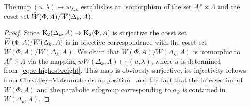 \begin{lemma} \label{lem:can-repr2}
The map $(u, \lambda) \mapsto w_{\lambda, u}$ establishes an isomorphism of the set $A^\times \times \Lambda$ and the coset set $\widehat{W}(\Phi, A) / \overline{W}(\Delta_k, A)$.
\end{lemma}
\begin{proof}
    Since $\operatorname{K}_2(\Delta_k, A) \to \operatorname{K}_2(\Phi, A)$ is surjective the coset set $\widehat{W}(\Phi, A) / \overline{W}(\Delta_k, A)$ is in bijective correspondence with the coset set
     $W(\Phi, A)/W(\Delta_k, A)$.
    We claim that $W(\Phi, A)/W(\Delta_k, A)$ is isomorphic to $A^\times \times \Lambda$
    via the mapping $w W(\Delta_k, A) \mapsto (u, \lambda)$, where $u$ is determined from~\eqref{eq:w-highestweight}.
    This map is obviously surjective, its injectivity follows from Chevalley--Matsumoto decomposition~\cite[Theorem~1.3]{St78}
    and the fact that the intersection of $W(\Phi, A)$ and the parabolic subgroup corresponding to $\alpha_k$ is contained in $W(\Delta_k, A)$.
\end{proof}

